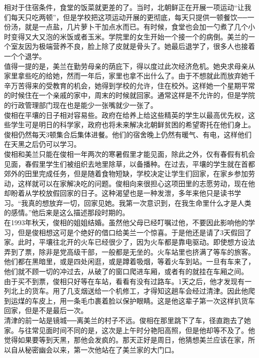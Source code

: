 相对于住宿条件，食堂的饭菜就更差的了。当时，北朝鲜正在开展一项运动“让我们每天只吃两顿”，但是学校把这项运动开展的更彻底，每天只提供一顿餐饮──一份汤，就是一点盐，几片萝卜干加点水而已。有时候，食堂也会加一勺煮了几个小时变得又大又泡的米饭或者玉米。学院里的女生开始一个接一个的病倒。美兰的一个室友因为极端营养不良，脸上除了皮就是骨头了。她最后退学了，很多人也接着一个个退学。\\

值得一提的是，美兰在勤劳母亲的荫庇下，得以度过此次经济危机。她央求母亲从家里拿些吃的给她，然而一年后，家里也拿不出什么了。由于不想就此而放弃她千辛万苦得来的受教育的机会，她得到学校的允许，住在校外。这样她一个星期平常的时候住在一个亲戚的家中，周末的时候就回家。通常这样是不允许的，但是学院的行政管理部门现在也是能少一张嘴就少一张了。\\

俊相在平壤的日子相对容易些。政府在给养上给这些精英的学生以最高优先权，这些学生可是明日的科学家，政府也将未来解决北朝鲜贫困的希望寄托在他们身上。俊相仍然每天3顿集合后集体进餐。他们的宿舍晚上仍然有暖气、有电，这样他们在天黑之后仍可以学习。\\

俊相和美兰只能在俊相一年两次的寒暑假里才能见面，除此之外，仅有春假有机会见面，春假里学生们被组织去地里除草，以备播种。在过去，平壤的学生就在首都郊外的田里完成任务，但是随着食物短缺，学校决定让学生们回家，在家乡参加劳动，这样就可以在家解决吃的问题。俊相向来很担心这项田里的志愿劳动，现在他却盼着从学校放假回家的日子。这种渴望也是一种发泄，多年来他只是读书学习。“我真的想放弃一切，回家见她。我第一次意识到，在我生命里什么才是人类的感情。”他后来是这么描述那段时期的。\\

在1993年秋天，俊相的姐姐结婚。虽然他父母已经叮嘱过他，不要因此影响他的学习，但是俊相想这可是个绝好的借口给美兰一个惊喜。于是他还是请了3天假回了家。此时，平壤往北开的火车已经很少了，因为火车都是靠电驱动。即使想方设法弄到了票，除非是党高级干部，一般都是无坐的。火车站里也挤满了等车的旅客。他们都在黑暗里，或是四处闲逛，或是蹲着吸烟，等着火车到站。一旦有车来了，他们就不顾一切的冲过去，从破了的窗口爬进车厢，或者有的就挂在车厢之间。\\

由于买不到票，俊相只好等在车站，看看有没有过路车。1天之后，他才发现有一列北上的货车。用了几支烟送给一个机修工，才得知这趟车会经过清津。因此他爬到运煤的车皮上，用一条毛巾裹着脸以保护眼睛。这是他这辈子第一次这样扒货车回家，但是不是最后一次。\\

清津的前一站是镜城──离美兰的村子不远。俊相在那里跳下了车，径直跑去了她家。与往常见面时间不同的是，这次是上午时分艳阳高照，但是他却等不及了。他觉得如果要等到天黑，那他会发疯的。那天正好是周日，他猜想美兰应该在家，所以自从秘密幽会以来，第一次他站在了美兰家的大门口。\\

